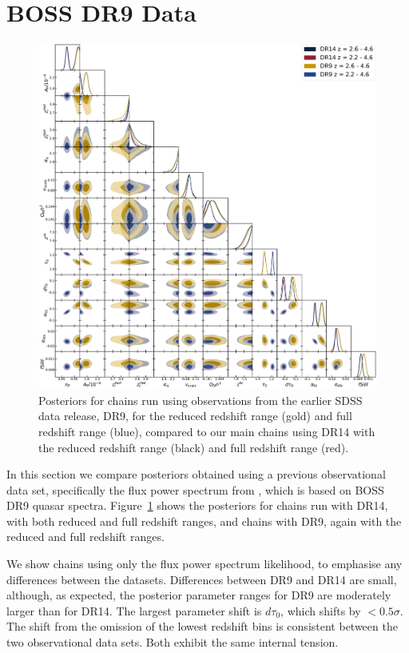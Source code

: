 \section{BOSS DR9 Data}\label{sec:dr9_results}
\begin{figure}
    \centering
    \includegraphics[width=\textwidth]{figures/dr9_allp_corner.pdf}
    \caption{\label{fig:dr9_corner}
    Posteriors for chains run using observations from the earlier SDSS data release, DR9, for the reduced redshift range (gold) and full redshift range (blue), compared to our main chains using DR14 with the reduced redshift range (black) and full redshift range (red).
    }
\end{figure}

In this section we compare posteriors obtained using a previous observational data set, specifically the flux power spectrum from \cite{2013A&A...559A..85P}, which is based on BOSS DR9 quasar spectra.
Figure~\ref{fig:dr9_corner} shows the posteriors for chains run with DR14, with both reduced and full redshift ranges, and chains with DR9, again with the reduced and full redshift ranges.

We show chains using only the flux power spectrum likelihood, to emphasise any differences between the datasets. Differences between DR9 and DR14 are small, although, as expected, the posterior parameter ranges for DR9 are moderately larger than for DR14. The largest parameter shift is $d\tau_0$, which shifts by $< 0.5 \sigma$. The shift from the omission of the lowest redshift bins is consistent between the two observational data sets. Both exhibit the same internal tension.

